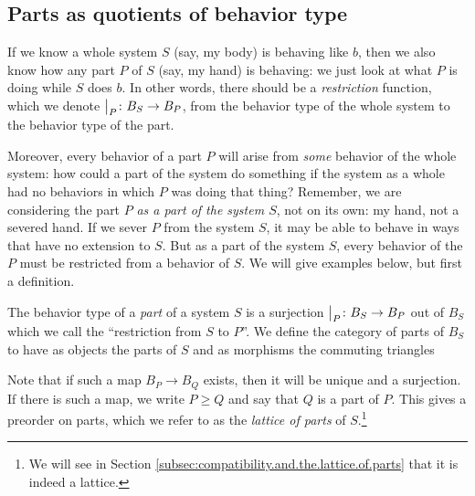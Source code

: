 \subsection{Parts as quotients of behavior type}
If we know a whole system $S$ (say, my body) is behaving like $b$, then we also know how any part $P$ of $S$ (say, my hand) is behaving: we just look at what $P$ is doing while $S$ does $b$. In other words, there should be a \emph{restriction} function, which we denote $\big|_{P}\colon B_S \to B_P$, from the behavior type of the whole system to the behavior type of the part. 

Moreover, every behavior of a part $P$ will arise from \emph{some} behavior of the whole system: how could a part of the system do something if the system as a whole had no behaviors in which $P$ was doing that thing? Remember, we are considering the part $P$ \emph{as a part of the system $S$}, not on its own: my hand, not a severed hand. If we sever $P$ from the system $S$, it may be able to behave in ways that have no extension to $S$. But as a part of the system $S$, every behavior of the $P$ must be restricted from a behavior of $S$. We will give examples below, but first a definition.

\begin{defn}\label{def.part}
The behavior type of a \emph{part} of a system $S$ is a surjection
$\big|_{P}\colon B_S \to B_P$ out of $B_S$ which we call the ``restriction from
$S$ to $P$''. We define the category of parts of $B_S$ to have as objects the parts of $S$ and as morphisms the commuting triangles
        \begin{center}
        \end{center}
Note that if such a map $B_P \to B_Q$ exists, then it will be unique and a
surjection. If there is such a map, we write $P \geq Q$ and say that $Q$ is a
part of $P$. This gives a preorder on parts, which we refer to as the
\emph{lattice of parts} of $S$.\footnote{We will see in Section
  \ref{subsec:compatibility.and.the.lattice.of.parts} that it is indeed a
  lattice.}
\end{defn}

